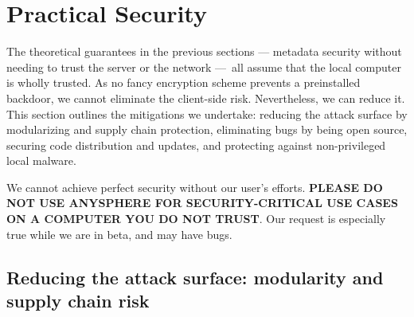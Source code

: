\newpage
\section{Practical Security}

The theoretical guarantees in the previous sections — metadata security without needing to trust the server or the network — all assume that the local computer is wholly trusted. As no fancy encryption scheme prevents a preinstalled backdoor, we cannot eliminate the client-side risk. Nevertheless, we can reduce it. This section outlines the mitigations we undertake: reducing the attack surface by modularizing and supply chain protection, eliminating bugs by being open source, securing code distribution and updates, and protecting against non-privileged local malware.

We cannot achieve perfect security without our user's efforts. \textbf{PLEASE DO NOT USE ANYSPHERE FOR SECURITY-CRITICAL USE CASES ON A COMPUTER YOU DO NOT TRUST}. Our request is especially true while we are in beta, and may have bugs.




\subsection{Reducing the attack surface: modularity and supply chain risk}

